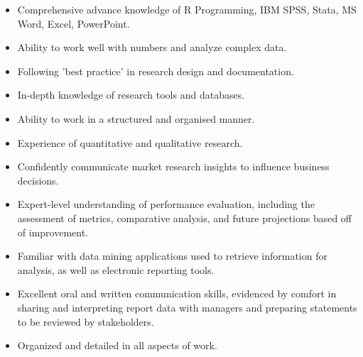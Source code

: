 

\begin{cvparagraph}

      \begin{itemize}[noitemsep,leftmargin=0.3cm]  %
  	 \setlength{\itemsep}{0pt}
    	\setlength{\parskip}{0pt}
    	\setlength{\parsep}{0pt}   


	\item Comprehensive advance knowledge of R Programming, IBM SPSS, Stata, MS Word, Excel, PowerPoint.
	\item Ability to work well with numbers and analyze complex data.
\item Following ’best practice’ in research design and documentation.
\item In-depth knowledge of research tools and databases.
\item Ability to work in a structured and organised manner.
\item Experience of quantitative and qualitative research.
\item Confidently communicate market research insights to influence business decisions.
\item Expert-level understanding of performance evaluation, including the assessment of metrics, comparative analysis, and future projections based off of improvement.
\item Familiar with data mining applications used to retrieve information for analysis, as well as electronic reporting tools.
\item Excellent oral and written communication skills, evidenced by comfort in sharing and interpreting report data with managers and
preparing statements to be reviewed by stakeholders.
\item Organized and detailed in all aspects of work.
\end{itemize}
\end{cvparagraph}
